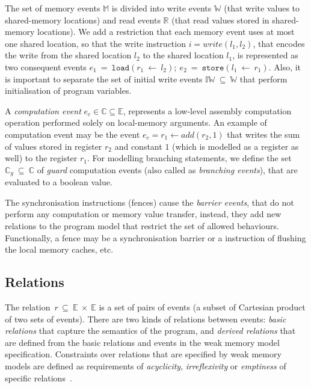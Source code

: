 The set of memory events $\mathbb{M}$ is divided into write events $\mathbb{W}$ (that write values to shared-memory locations) and read events $\mathbb{R}$ (that read values stored in shared-memory locations).
We add a restriction that each memory event uses at most one shared location, so that the write instruction $i = write(l_1, l_2)$, that encodes the write from the shared location $l_2$ to the shared location $l_1$, is represented as two consequent events $e_1~=~\texttt{load}(r_1~\leftarrow~l_2); \ e_2~=~\texttt{store}(l_1~\leftarrow~r_1)$.
Also, it is important to separate the set of initial write events $\mathbb{IW}~\subseteq~\mathbb{W}$ that perform initialisation of program variables.

A \textit{computation event} $e_c \in \mathbb{C} \subseteq \mathbb{E}$, represents a low-level assembly computation operation performed solely on local-memory arguments.
An example of computation event may be the event $e_c = r_1 \leftarrow add(r_2, 1)$ that writes the sum of values stored in register $r_2$ and constant $1$ (which is modelled as a register as well) to the register $r_1$.
For modelling branching statements, we define the set $\mathbb{C}_{g}~\subseteq~\mathbb{C}$ of \textit{guard} computation events (also called as \textit{branching events}), that are evaluated to a boolean value.

The synchronisation instructions (fences) cause the \textit{barrier events}, that do not perform any computation or memory value transfer, instead, they add new relations to the program model that restrict the set of allowed behaviours.
Functionally, a fence may be a synchronisation barrier or a instruction of flushing the local memory caches, etc.


\subsection{Relations}
\label{ch:wmm:model:relations}


The relation~$r\,\subseteq~\mathbb{E}~\times~\mathbb{E}$ is a set of pairs of events (a subset of Cartesian product of two sets of events). There are two kinds of relations between events: \textit{basic relations} that capture the semantics of the program, and \textit{derived relations} that are defined from the basic relations and events in the weak memory model specification. Constraints over relations that are specified by weak memory models are defined as requirements of \textit{acyclicity}, \textit{irreflexivity} or \textit{emptiness} of specific relations~\cite{alglave2016syntax}.

